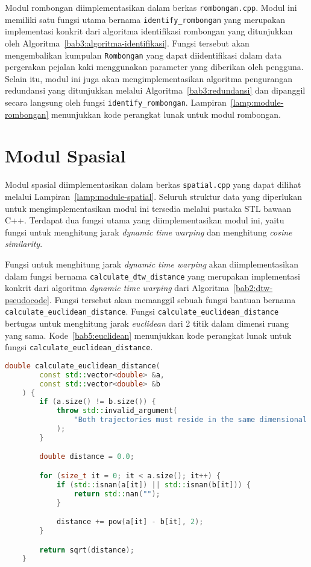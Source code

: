 Modul rombongan diimplementasikan dalam berkas \texttt{rombongan.cpp}. Modul ini memiliki satu fungsi utama bernama \texttt{identify\_rombongan} yang merupakan implementasi konkrit dari algoritma identifikasi rombongan yang ditunjukkan oleh Algoritma~\ref{bab3:algoritma-identifikasi}. Fungsi tersebut akan mengembalikan kumpulan \texttt{Rombongan} yang dapat diidentifikasi dalam data pergerakan pejalan kaki menggunakan parameter yang diberikan oleh pengguna. Selain itu, modul ini juga akan mengimplementasikan algoritma pengurangan redundansi yang ditunjukkan melalui Algoritma~\ref{bab3:redundansi} dan dipanggil secara langsung oleh fungsi \texttt{identify\_rombongan}. Lampiran~\ref{lamp:module-rombongan} menunjukkan kode perangkat lunak untuk modul rombongan.

\section{Modul Spasial}

Modul spasial diimplementasikan dalam berkas \texttt{spatial.cpp} yang dapat dilihat melalui Lampiran~\ref{lamp:module-spatial}. Seluruh struktur data yang diperlukan untuk mengimplementasikan modul ini tersedia melalui pustaka STL bawaan C++. Terdapat dua fungsi utama yang diimplementasikan modul ini, yaitu fungsi untuk menghitung jarak \textit{dynamic time warping} dan menghitung \textit{cosine similarity}.

Fungsi untuk menghitung jarak \textit{dynamic time warping} akan diimplementasikan dalam fungsi bernama \texttt{calculate\_dtw\_distance} yang merupakan implementasi konkrit dari algoritma \textit{dynamic time warping} dari Algoritma~\ref{bab2:dtw-pseudocode}. Fungsi tersebut akan memanggil sebuah fungsi bantuan bernama \texttt{calculate\_euclidean\_distance}. Fungsi \texttt{calculate\_euclidean\_distance} bertugas untuk menghitung jarak \textit{euclidean} dari 2 titik dalam dimensi ruang yang sama. Kode~\ref{bab5:euclidean} menunjukkan kode perangkat lunak untuk fungsi \texttt{calculate\_euclidean\_distance}.

\begin{lstlisting}[language=C++, caption=Implementasi fungsi \texttt{calculate\_euclidean\_distance}, label={bab5:euclidean}]
    double calculate_euclidean_distance(
        const std::vector<double> &a,
        const std::vector<double> &b
    ) {
        if (a.size() != b.size()) {
            throw std::invalid_argument(
                "Both trajectories must reside in the same dimensional space."
            );
        }

        double distance = 0.0;

        for (size_t it = 0; it < a.size(); it++) {
            if (std::isnan(a[it]) || std::isnan(b[it])) {
                return std::nan("");
            }

            distance += pow(a[it] - b[it], 2);
        }

        return sqrt(distance);
    }
\end{lstlisting}

